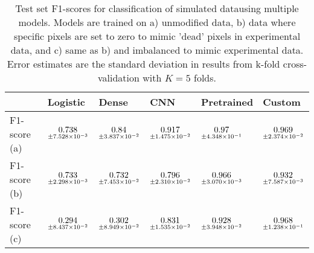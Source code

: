 \begin{table}
\centering
\caption{
Test set F1-scores for classification of simulated datausing multiple models.
Models are trained on a) unmodified data, b) data where specific pixels are set to zero to mimic
'dead' pixels in experimental data, and c) same as b) and imbalanced to mimic experimental data. 
Error estimates are the standard deviation in results from k-fold cross-validation with $K=5$ folds.
}
\label{tab:classification-simulated-all-f1-auc}
\begin{tabular}{llllll}
\toprule
{} &                                            Logistic &                                               Dense &                                                 CNN &                                          Pretrained &                                              Custom \\
\midrule
F1-score (a) &  $\underset{\num{+- 7.528e-03 }  }{\num{ 0.738 } }$ &  $\underset{\num{+- 3.837e-02 }  }{\num{ 0.84 } }$ &  $\underset{\num{+- 1.475e-02 }  }{\num{ 0.917 } }$ &  $\underset{\num{+- 4.348e-01 }  }{\num{ 0.97 } }$ &  $\underset{\num{+- 2.374e-02 }  }{\num{ 0.969 } }$ \\
F1-score (b) &  $\underset{\num{+- 2.298e-03 }  }{\num{ 0.733 } }$ &  $\underset{\num{+- 7.453e-02 }  }{\num{ 0.732 } }$ &  $\underset{\num{+- 2.310e-02 }  }{\num{ 0.796 } }$ &  $\underset{\num{+- 3.070e-03 }  }{\num{ 0.966 } }$ &  $\underset{\num{+- 7.587e-03 }  }{\num{ 0.932 } }$ \\
F1-score (c) &  $\underset{\num{+- 8.437e-02 }  }{\num{ 0.294 } }$ &  $\underset{\num{+- 8.949e-02 }  }{\num{ 0.302 } }$ &  $\underset{\num{+- 1.535e-02 }  }{\num{ 0.831 } }$ &  $\underset{\num{+- 3.948e-02 }  }{\num{ 0.928 } }$ &  $\underset{\num{+- 1.238e-01 }  }{\num{ 0.968 } }$ \\
\bottomrule
\end{tabular}
\end{table}

